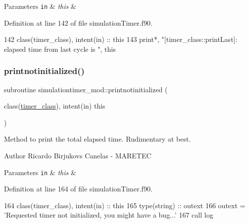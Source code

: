 \begin{DoxyParams}[1]{Parameters}
\mbox{\tt in}  & {\em this} & \\
\hline
\end{DoxyParams}


Definition at line 142 of file simulation\+Timer.\+f90.


\begin{DoxyCode}
142     \textcolor{keywordtype}{class}(timer\_class), \textcolor{keywordtype}{intent(in)} :: this
143     print*, \textcolor{stringliteral}{"[timer\_class::printLast]: elapsed time from last cycle is "}, this%
\end{DoxyCode}
\mbox{\label{namespacesimulationtimer__mod_a1c7581b4e12efde67021c8d94e0ef696}} 
\subsubsection{\texorpdfstring{printnotinitialized()}{printnotinitialized()}}
{\footnotesize\ttfamily subroutine simulationtimer\+\_\+mod\+::printnotinitialized (\begin{DoxyParamCaption}\item[{class(\mbox{\hyperlink{structsimulationtimer__mod_1_1timer__class}{timer\+\_\+class}}), intent(in)}]{this }\end{DoxyParamCaption})\hspace{0.3cm}{\ttfamily [private]}}



Method to print the total elapsed time. Rudimentary at best. 

\begin{DoxyAuthor}{Author}
Ricardo Birjukovs Canelas -\/ M\+A\+R\+E\+T\+EC 
\end{DoxyAuthor}

\begin{DoxyParams}[1]{Parameters}
\mbox{\tt in}  & {\em this} & \\
\hline
\end{DoxyParams}


Definition at line 164 of file simulation\+Timer.\+f90.


\begin{DoxyCode}
164     \textcolor{keywordtype}{class}(timer\_class), \textcolor{keywordtype}{intent(in)} :: this
165     \textcolor{keywordtype}{type}(string) :: outext
166     outext = \textcolor{stringliteral}{'Requested timer not initialized, you might have a bug...'}
167     \textcolor{keyword}{call }log%
\end{DoxyCode}
\mbox{\label{namespacesimulationtimer__mod_a0924f340c4f5785a5981bdc99226e576}} 
